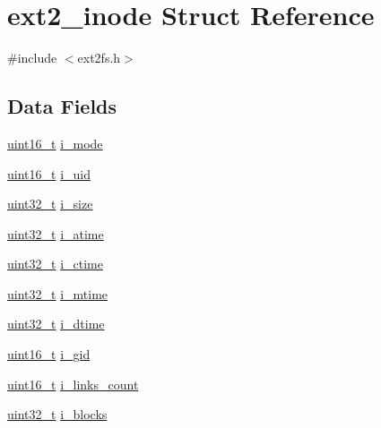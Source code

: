 \hypertarget{structext2__inode}{\section{ext2\-\_\-inode \-Struct \-Reference}
\label{structext2__inode}
}


{\ttfamily \#include $<$ext2fs.\-h$>$}

\subsection*{\-Data \-Fields}
\begin{DoxyCompactItemize}
\item 
\hyperlink{types_8h_a273cf69d639a59973b6019625df33e30}{uint16\-\_\-t} \hyperlink{structext2__inode_ab18d6b6ddb4d36a2faff527b43241126}{i\-\_\-mode}
\item 
\hyperlink{types_8h_a273cf69d639a59973b6019625df33e30}{uint16\-\_\-t} \hyperlink{structext2__inode_a082def4b3c1c0c5f9dce1eab8ba51189}{i\-\_\-uid}
\item 
\hyperlink{types_8h_a435d1572bf3f880d55459d9805097f62}{uint32\-\_\-t} \hyperlink{structext2__inode_a2b9e2a1c732aa02b5dead0948fb47c72}{i\-\_\-size}
\item 
\hyperlink{types_8h_a435d1572bf3f880d55459d9805097f62}{uint32\-\_\-t} \hyperlink{structext2__inode_adb682923fb8b418217d78fd78737406b}{i\-\_\-atime}
\item 
\hyperlink{types_8h_a435d1572bf3f880d55459d9805097f62}{uint32\-\_\-t} \hyperlink{structext2__inode_a7d45cc039be5128d9771412191e55544}{i\-\_\-ctime}
\item 
\hyperlink{types_8h_a435d1572bf3f880d55459d9805097f62}{uint32\-\_\-t} \hyperlink{structext2__inode_a7eb44698eabf570fee0e65d22cc5fbd1}{i\-\_\-mtime}
\item 
\hyperlink{types_8h_a435d1572bf3f880d55459d9805097f62}{uint32\-\_\-t} \hyperlink{structext2__inode_a2a30cea7fb676d2fa5e9f0bd799dfa7c}{i\-\_\-dtime}
\item 
\hyperlink{types_8h_a273cf69d639a59973b6019625df33e30}{uint16\-\_\-t} \hyperlink{structext2__inode_af1686b705ca7912d370d12ceaab83b8b}{i\-\_\-gid}
\item 
\hyperlink{types_8h_a273cf69d639a59973b6019625df33e30}{uint16\-\_\-t} \hyperlink{structext2__inode_aa6d7753ffe6e8634bafe0b55638ee29a}{i\-\_\-links\-\_\-count}
\item 
\hyperlink{types_8h_a435d1572bf3f880d55459d9805097f62}{uint32\-\_\-t} \hyperlink{structext2__inode_a6e5b258ebc92b6ae75c61572c60cbb4b}{i\-\_\-blocks}

\end{DoxyCompactItemize}
